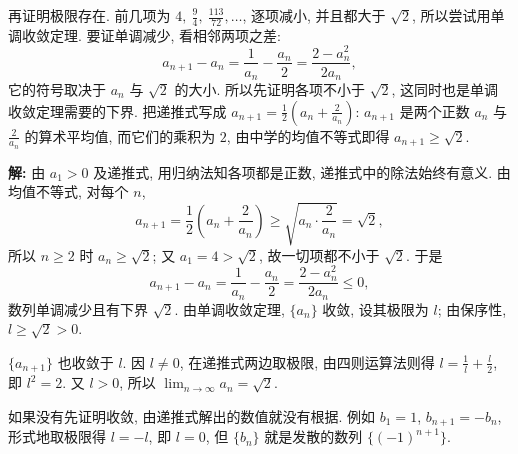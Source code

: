 \documentclass[UTF8,openany]{ctexbook}
\theoremstyle{chinesetextbook}
\newenvironment{cnsolution}{\par\indent\textbf{解:} \ignorespaces}{\par}
\begin{document}
再证明极限存在. 前几项为 $\displaystyle4,\ \frac94,\ \frac{113}{72},\ldots$, 逐项减小, 并且都大于 $\sqrt2$, 所以尝试用单调收敛定理. 要证单调减少, 看相邻两项之差:
\[
a_{n+1}-a_n=\frac1{a_n}-\frac{a_n}2=\frac{2-a_n^2}{2a_n},
\]
它的符号取决于 $a_n$ 与 $\sqrt2$ 的大小. 所以先证明各项不小于 $\sqrt2$, 这同时也是单调收敛定理需要的下界. 把递推式写成 $\displaystyle a_{n+1}=\frac12\left(a_n+\frac2{a_n}\right)$: $a_{n+1}$ 是两个正数 $a_n$ 与 $\displaystyle\frac2{a_n}$ 的算术平均值, 而它们的乘积为 $2$, 由中学的均值不等式即得 $a_{n+1}\ge\sqrt2$.
\begin{cnsolution}
由 $a_1>0$ 及递推式, 用归纳法知各项都是正数, 递推式中的除法始终有意义. 由均值不等式, 对每个 $n$,
\[
a_{n+1}=\frac12\left(a_n+\frac2{a_n}\right)\ge\sqrt{a_n\cdot\frac2{a_n}}=\sqrt2,
\]
所以 $n\ge2$ 时 $a_n\ge\sqrt2$; 又 $a_1=4>\sqrt2$, 故一切项都不小于 $\sqrt2$. 于是
\[
a_{n+1}-a_n=\frac1{a_n}-\frac{a_n}2=\frac{2-a_n^2}{2a_n}\le0,
\]
数列单调减少且有下界 $\sqrt2$. 由单调收敛定理, $\{a_n\}$ 收敛, 设其极限为 $l$; 由保序性, $l\ge\sqrt2>0$.

$\{a_{n+1}\}$ 也收敛于 $l$. 因 $l\ne0$, 在递推式两边取极限, 由四则运算法则得 $\displaystyle l=\frac1l+\frac l2$, 即 $l^2=2$. 又 $l>0$, 所以 $\displaystyle\lim_{n\to\infty}a_n=\sqrt2$.
\end{cnsolution}
如果没有先证明收敛, 由递推式解出的数值就没有根据. 例如 $b_1=1$, $b_{n+1}=-b_n$, 形式地取极限得 $l=-l$, 即 $l=0$, 但 $\{b_n\}$ 就是发散的数列 $\{(-1)^{n+1}\}$.
\end{document}
